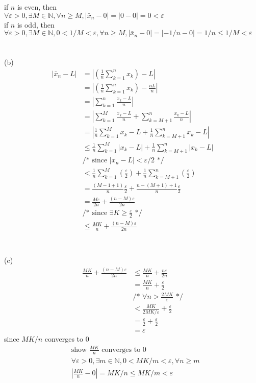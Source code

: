 \documentclass[12pt, border = 4pt, multi]{article} %
\begin{document}
if $n$ is even, then\\
$\forall \varepsilon > 0, \exists M \in \mathbb{N}, \forall n \geq M, |\bar{x}_n - 0| = |0 - 0| = 0 < \varepsilon$\\
if $n$ is odd, then\\
$\forall \varepsilon > 0, \exists M \in \mathbb{N}, 0 < 1 / M < \varepsilon, \forall n \geq M, |\bar{x}_n - 0| = |-1 / n - 0| = 1 / n \leq 1 / M < \varepsilon$\\
\\
\\
(b)
\begin{align*}
|\bar{x}_n - L| &= \left|\left(\frac{1}{n}\sum_{k = 1} ^ n x_k\right) - L\right|\\
&= \left|\left(\frac{1}{n}\sum_{k = 1} ^ n x_k\right) - \frac{nL}{n}\right|\\
&= \left|\sum_{k = 1} ^ n\frac{x_k - L}{n}\right|\\
&= \left|\sum_{k = 1} ^ M\frac{x_k - L}{n} + \sum_{k = M + 1} ^ n\frac{x_k - L}{n}\right|\\
&= \left|\frac{1}{n}\sum_{k = 1} ^ M x_k - L + \frac{1}{n}\sum_{k = M + 1} ^ n x_k - L\right|\\
&\leq \frac{1}{n}\sum_{k = 1} ^ M |x_k - L| + \frac{1}{n}\sum_{k = M + 1} ^ n |x_k - L|\\
&\text{/* since } |x_n - L| < \varepsilon / 2 \text{ */}\\
&< \frac{1}{n}\sum_{k = 1} ^ M \left(\frac{\varepsilon}{2}\right) + \frac{1}{n}\sum_{k = M + 1} ^ n \left(\frac{\varepsilon}{2}\right)\\
&= \frac{(M - 1 + 1)}{n}\frac{\varepsilon}{2} + \frac{n - (M + 1) + 1}{n}\frac{\varepsilon}{2}\\
&= \frac{M\varepsilon}{2n} + \frac{(n - M)\varepsilon}{2n}\\
&\text{/* since } \exists K \geq \frac{\varepsilon}{2} \text{ */}\\
&\leq \frac{MK}{n} + \frac{(n - M)\varepsilon}{2n}\\
\end{align*}
\\
\\
(c)
\begin{align*}
\frac{MK}{n} + \frac{(n - M)\varepsilon}{2n} &\leq \frac{MK}{n} + \frac{n\varepsilon}{2n}\\
&= \frac{MK}{n} + \frac{\varepsilon}{2}\\
&\text{/* }\forall n > \frac{2MK}{\varepsilon}\text{ */}\\
&< \frac{MK}{2MK / \varepsilon} + \frac{\varepsilon}{2}\\
&= \frac{\varepsilon}{2} + \frac{\varepsilon}{2}\\
&= \varepsilon
\end{align*}
since $MK / n$ converges to 0
\begin{align*}
&\text{show } \frac{MK}{n} \text{ converges to 0}\\
&\forall \varepsilon > 0, \exists m \in \mathbb{N}, 0 < MK / m < \varepsilon, \forall n \geq m\\
&\left|\frac{MK}{n} - 0\right| = MK / n \leq MK / m < \varepsilon
\end{align*}
\end{document}
